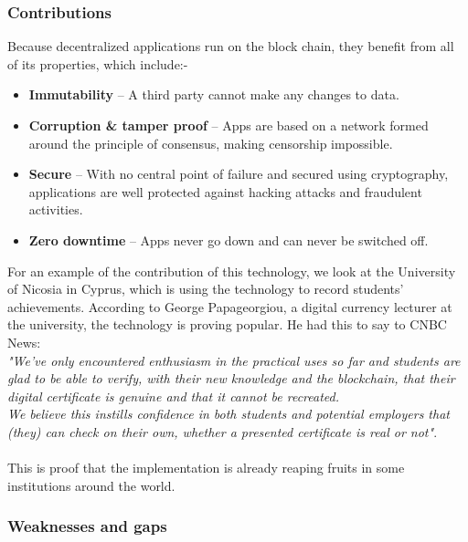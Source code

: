 \subsubsection{Contributions}
Because decentralized applications run on the block chain, they benefit from all of its properties, which include:-\\
\begin{itemize}
\item \textbf{Immutability} – A third party cannot make any changes to data.
\item \textbf{Corruption \& tamper proof} – Apps are based on a network formed around the principle of consensus, making censorship impossible.
\item \textbf{Secure} – With no central point of failure and secured using cryptography, applications are well protected against hacking attacks and fraudulent activities.
\item \textbf{Zero downtime} – Apps never go down and can never be switched off.
\end{itemize}
For an example of the contribution of this technology, we look at the University of Nicosia in Cyprus, which is using the technology to record students' achievements. According to George Papageorgiou, a digital currency lecturer at the university, the technology is proving popular. He had this to say to CNBC News: \\ 
\textit{"We've only encountered enthusiasm in the practical uses so far and students are glad to be able to verify, with their new knowledge and the blockchain, that their digital certificate is genuine and that it cannot be recreated.\\
We believe this instills confidence in both students and potential employers that (they) can check on their own, whether a presented certificate is real or not"}.\cite{art11} \\ \\
This is proof that the implementation is already reaping fruits in some institutions around the world.

\subsubsection{Weaknesses and gaps}

